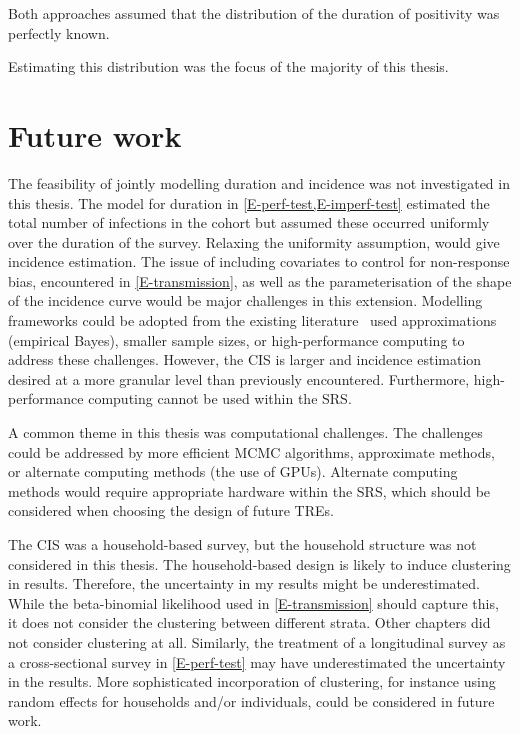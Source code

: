 \documentclass[thesis.tex]{subfiles}
\begin{document}
Both approaches assumed that the distribution of the duration of positivity was perfectly known.

Estimating this distribution was the focus of the majority of this thesis.


\section{Future work} \label{conclusion:sec:future-work}

The feasibility of jointly modelling duration and incidence was not investigated in this thesis.
The model for duration in \cref{E-perf-test,E-imperf-test} estimated the total number of infections in the cohort but assumed these occurred uniformly over the duration of the survey.
Relaxing the uniformity assumption, would give incidence estimation.
The issue of including covariates to control for non-response bias, encountered in \cref{E-transmission}, as well as the parameterisation of the shape of the incidence curve would be major challenges in this extension.
Modelling frameworks could be adopted from the existing literature~\autocite[e.g.][]{taffeJoint,haySerosolver} used approximations (\eg empirical Bayes), smaller sample sizes, or high-performance computing to address these challenges.
However, the CIS is larger and incidence estimation desired at a more granular level than previously encountered.
Furthermore, high-performance computing cannot be used within the SRS.

A common theme in this thesis was computational challenges.
The challenges could be addressed by more efficient MCMC algorithms, approximate methods, or alternate computing methods (\eg the use of GPUs).
Alternate computing methods would require appropriate hardware within the SRS, which should be considered when choosing the design of future TREs.

The CIS was a household-based survey, but the household structure was not considered in this thesis.
The household-based design is likely to induce clustering in results.
Therefore, the uncertainty in my results might be underestimated.
While the beta-binomial likelihood used in \cref{E-transmission} should capture this, it does not consider the clustering between different strata.
Other chapters did not consider clustering at all.
Similarly, the treatment of a longitudinal survey as a cross-sectional survey in \cref{E-perf-test} may have underestimated the uncertainty in the results.
More sophisticated incorporation of clustering, for instance using random effects for households and/or individuals, could be considered in future work.
\end{document}
